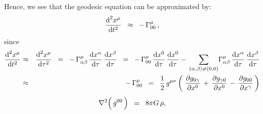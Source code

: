 \begin{remark}
Hence, we see that the geodesic equation can be approximated by:
\begin{equation*}
\dfrac{\textnormal{d}^{2}x^{\mu}}{\textnormal{d} t^{2}}
\;\; \approx \;\;
	-\,\Gamma^{\mu}_{00}\,,
\end{equation*}
since
\begin{eqnarray*}
\dfrac{\textnormal{d}^{2}x^{\mu}}{\textnormal{d} t^{2}}
& \approx &
	\dfrac{\textnormal{d}^{2}x^{\mu}}{\textnormal{d}\tau^{2}}
\;\; = \;\;
	-\,\Gamma^{\mu}_{\alpha\beta}\,\dfrac{\textnormal{d} x^{\alpha}}{\textnormal{d}\tau}\,\dfrac{\textnormal{d} x^{\beta}}{\textnormal{d}\tau}
\;\; = \;\;
	-\,\Gamma^{\mu}_{00}\,\dfrac{\textnormal{d} x^{0}}{\textnormal{d}\tau}\,\dfrac{\textnormal{d} x^{0}}{\textnormal{d}\tau}
	-\,\underset{(\alpha,\beta)\neq(0,0)}{\sum}
	\Gamma^{\mu}_{\alpha\beta}\,\dfrac{\textnormal{d} x^{\alpha}}{\textnormal{d}\tau}\,\dfrac{\textnormal{d} x^{\beta}}{\textnormal{d}\tau}
\\
& \approx &
	-\,\Gamma^{\mu}_{00}
\;\; = \;\;
	\dfrac{1}{2}\,g^{\mu\nu}\left(\;
		\dfrac{\partial g_{0\gamma}}{\partial x^{0}}
		\,+\,
		\dfrac{\partial g_{\gamma0}}{\partial x^{0}}
		\,-\,
		\dfrac{\partial g_{00}}{\partial x^{\gamma}}
		\,\right)
\end{eqnarray*}
\begin{equation*}
\nabla^{2}\!\left(\,\overset{{\color{white}.}}{g^{00}}\,\right) \;\; = \;\; 8 \pi G \, \rho,
\end{equation*}
\end{remark}


